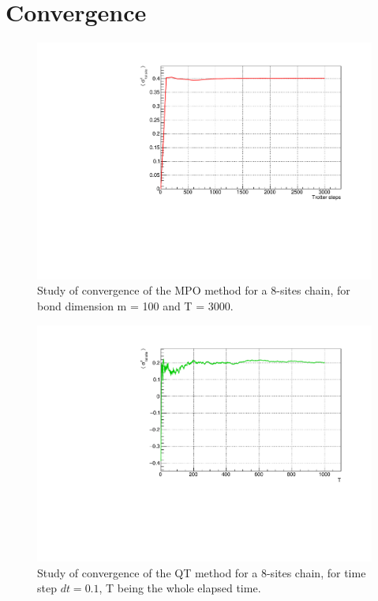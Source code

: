 \section{Convergence}

\begin{figure}[H]
    \label{fig:convergence_mpo_8sites}
    \centering
    \includegraphics[scale=0.7]{Figures/convergence/Convergence_s8T3000J1051.pdf}
    \caption{Study of convergence of the MPO method for a 8-sites chain, for bond dimension m = 100 and T = 3000.}
    \label{fig:convergenceMPO_8sites}
\end{figure}

\begin{figure}[H]
    \label{fig:convergence_mpo_8sites}
    \centering
    \includegraphics[scale=0.7]{Figures/convergence/Convergence_s8J10505.pdf}
    \caption{Study of convergence of the QT method for a 8-sites chain, for time step $dt=0.1$, T being the whole elapsed time.}
    \label{fig:convergenceMPO_8sites}
\end{figure}

